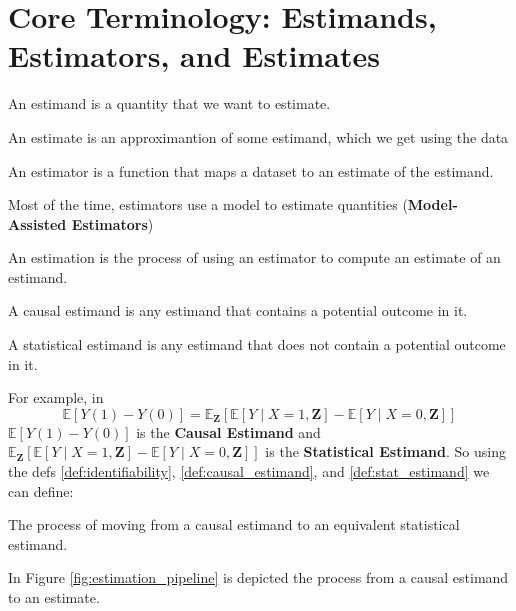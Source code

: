 \section{Core Terminology: Estimands, Estimators, and Estimates}
\begin{definition}[Estimand]
    An estimand is a quantity that we want to estimate.    
\end{definition}
\begin{definition}[Estimate]
    An estimate is an approximantion of some estimand, which we get using the data
\end{definition}
\begin{definition}[Estimator]
    An estimator is a function that maps a dataset to an estimate of the estimand.
\end{definition}
Most of the time, estimators use a model to estimate quantities (\textbf{Model-Assisted Estimators})
\begin{definition}[Estimation]
    An estimation is the process of using an estimator to compute an estimate of an estimand.
\end{definition}
\begin{definition}
    \label{def:causal_estimand}
    A causal estimand is any estimand that contains a potential outcome in it. 
\end{definition}
\begin{definition}
    \label{def:stat_estimand}
    A statistical estimand is any estimand that does not contain a potential outcome in it.
\end{definition}
For example, in 
\[
\mathbb{E}[Y(1) - Y(0)] = \mathbb{E}_{\mathbf{Z}}[\mathbb{E}[Y \mid X = 1, \mathbf{Z}] - \mathbb{E}[Y \mid X = 0, \mathbf{Z}]]
\] 
$\mathbb{E}[Y(1) - Y(0)]$ is the \textbf{Causal Estimand} and 
$\mathbb{E}_{\mathbf{Z}}[\mathbb{E}[Y \mid X = 1, \mathbf{Z}] - \mathbb{E}[Y \mid X = 0, \mathbf{Z}]]$ 
is the \textbf{Statistical Estimand}.
So using the defs \ref{def:identifiability}, \ref{def:causal_estimand}, and \ref{def:stat_estimand} we can define:
\begin{definition}[Identification]
    The process of moving from a causal estimand
    to an equivalent statistical estimand.  
\end{definition}
In Figure \ref{fig:estimation_pipeline} is depicted the process from a causal estimand to an estimate.
